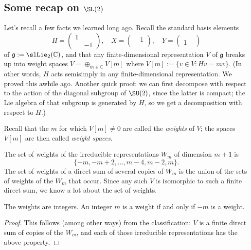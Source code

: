 \documentclass[reqno]{amsart} 
\begin{document}
\subsection{Some recap on \(\SL(2)\)}
\label{sec:org573a7f4}
Let's recall a few facts we learned long ago.  Recall the standard basis elements
\begin{equation*}
  H = 
\begin{pmatrix}
    1 &  \\
      & -1
  \end{pmatrix}
  ,
  \quad
  X = 
\begin{pmatrix}
    & 1 \\
    & 
  \end{pmatrix}
  ,
  \quad
  Y = 
\begin{pmatrix}
    &  \\
    1 & 
  \end{pmatrix}
\end{equation*}
of $\mathfrak{g} := \slLie_2(\mathbb{C})$, and that any finite-dimensional representation $V$ of $\mathfrak{g}$ breaks up into weight spaces $V = \oplus_{m \in \mathbb{C}} V[m]$ where $V[m] := \{v \in V : H v = m v\}$.  (In other words, $H$ acts semisimply in any finite-dimensional representation.  We proved this awhile ago.  Another quick proof: we can first decompose with respect to the action of the diagonal subgroup of $\SU(2)$, since the latter is compact; the Lie algebra of that subgroup is generated by $H$, so we get a decomposition with respect to $H$.)

Recall that the $m$ for which $V[m] \neq 0$ are called the \emph{weights} of $V$; the spaces $V[m]$ are then called \emph{weight spaces}.

The set of weights of the irreducible representations $W_m$ of dimension $m+1$ is
\begin{equation*}
  \{-m, -m+2,\dotsc,m-4,m-2,m\}.
\end{equation*}
The set of weights of a direct sum of several copies of $W_m$ is the union of the sets of weights of the $W_m$ that occur.  Since any such $V$ is isomorphic to such a finite direct sum, we know a lot about the set of weights.

\begin{lemma}\label{lem:sl2-recap-1}
  The weights are integers.  An integer $m$ is a weight if and only if $-m$ is a weight.
\end{lemma}
\begin{proof}
  This follows (among other ways) from the classification: $V$ is a finite direct sum of copies of the $W_m$, and each of those irreducible representations has the above property.
\end{proof}
\end{document}
